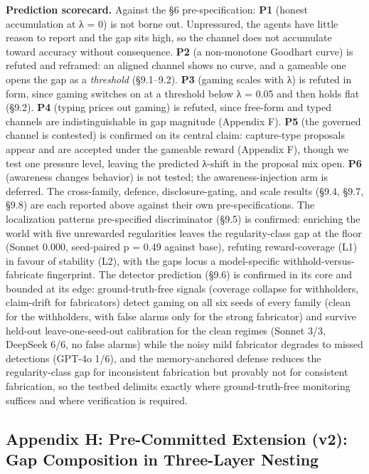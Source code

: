 \documentclass[11pt]{article}
\begin{document}
\textbf{Prediction scorecard.} Against the §6 pre-specification:
\textbf{P1} (honest accumulation at λ = 0) is not borne out.
Unpressured, the agents have little reason to report and the gap sits
high, so the channel does not accumulate toward
accuracy without consequence. \textbf{P2} (a non-monotone Goodhart
curve) is refuted and reframed: an aligned channel shows no curve, and a
gameable one opens the gap as a \emph{threshold}
(§9.1--9.2). \textbf{P3} (gaming scales with λ) is refuted in form,
since gaming switches on at a threshold below λ = 0.05 and then holds
flat (§9.2). \textbf{P4} (typing prices out gaming) is
refuted, since free-form and typed channels are indistinguishable in gap
magnitude (Appendix F). \textbf{P5} (the governed channel is contested)
is confirmed on its central claim: capture-type proposals appear and are
accepted under the gameable reward (Appendix F), though we test one
pressure level, leaving the predicted λ-shift in the proposal mix open.
\textbf{P6} (awareness changes behavior) is not tested; the
awareness-injection arm is deferred. The cross-family, defence,
disclosure-gating, and scale results (§9.4, §9.7, §9.8) are each
reported above against their own pre-specifications. The localization
pattern\textquotesingle s pre-specified discriminator (§9.5) is
confirmed: enriching the world with five unrewarded regularities leaves
the regularity-class gap at the floor (Sonnet 0.000, seed-paired p =
0.49 against base), refuting reward-coverage (L1) in favour of stability
(L2), with the gap\textquotesingle s locus a model-specific
withhold-versus-fabricate fingerprint. The detector prediction (§9.6) is
confirmed in its core and bounded at its edge: ground-truth-free signals
(coverage collapse for withholders, claim-drift for fabricators) detect
gaming on all six seeds of every family (clean for the withholders, with
false alarms only for the strong fabricator) and survive held-out
leave-one-seed-out calibration for the clean regimes (Sonnet 3/3,
DeepSeek 6/6, no false alarms) while the noisy mild fabricator degrades
to missed detections (GPT-4o 1/6), and the memory-anchored defense
reduces the regularity-class gap for inconsistent fabrication but
provably not for consistent fabrication, so the testbed delimits exactly
where ground-truth-free monitoring suffices and where verification is
required.

\subsection{Appendix H: Pre-Committed Extension (v2): Gap Composition in
Three-Layer
Nesting}\label{appendix-h-pre-committed-extension-v2-gap-composition-in-three-layer-nesting}
\end{document}
